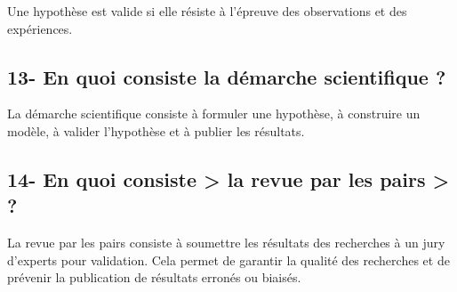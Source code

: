 \documentclass{article}
\begin{document}
Une hypothèse est valide si elle résiste à l'épreuve des observations et des expériences.

\subsection*{13- En quoi consiste la démarche scientifique ?}

La démarche scientifique consiste à formuler une hypothèse, à construire un modèle, à valider l'hypothèse et à publier les résultats.

\subsection*{14- En quoi consiste > la revue par les pairs > ?}

La revue par les pairs consiste à soumettre les résultats des recherches à un jury d'experts pour validation. Cela permet de garantir la qualité des recherches et de prévenir la publication de résultats erronés ou biaisés.


\end{document}
